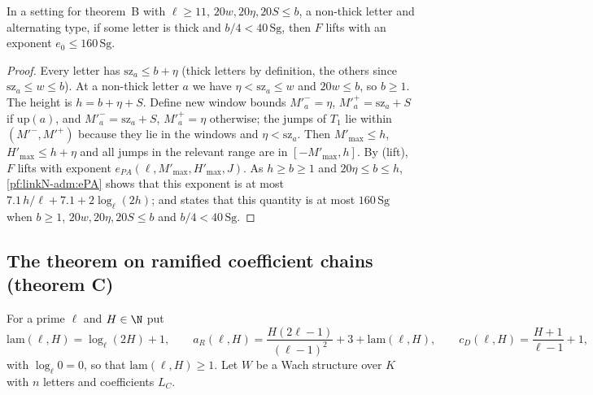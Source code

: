 \begin{lemma}\label{pf:linkN-adm:thick}
In a setting for theorem~B with $\ell\ge11$, $20w,20\eta,20S\le b$, a non-thick letter and alternating type, if some letter is thick
and $b/4<40\,\mathrm{Sg}$, then $F$ lifts with an exponent $e_0\le160\,\mathrm{Sg}$.
\end{lemma}

\begin{proof}
Every letter has $\mathrm{sz}_a\le b+\eta$ (thick letters by definition, the others since $\mathrm{sz}_a\le w\le b$). At a
non-thick letter $a$ we have $\eta<\mathrm{sz}_a\le w$ and $20w\le b$, so $b\ge1$. The height is $h=b+\eta+S$. Define new
window bounds $M'^-_a=\eta$, $M'^+_a=\mathrm{sz}_a+S$ if $\mathrm{up}(a)$, and $M'^-_a=\mathrm{sz}_a+S$, $M'^+_a=\eta$
otherwise; the jumps of $T_1$ lie within $(M'^-,M'^+)$ because they lie in the windows and $\eta<\mathrm{sz}_a$. Then
$M'_{\max}\le h$, $H'_{\max}\le h+\eta$ and all jumps in the relevant range are in $[-M'_{\max},h]$. By (lift), $F$ lifts with
exponent $e_{PA}(\ell,M'_{\max},H'_{\max},J)$. As $h\ge b\ge1$ and $20\eta\le b\le h$, \cref{pf:linkN-adm:ePA} shows that
this exponent is at most $7.1\,h/\ell+7.1+2\log_\ell(2h)$; and  states that this
quantity is at most $160\,\mathrm{Sg}$ when $b\ge1$, $20w,20\eta,20S\le b$ and $b/4<40\,\mathrm{Sg}$.
\end{proof}

\subsection{The theorem on ramified coefficient chains (theorem C)}\label{pf:linkN-adm:thmCsec}

For a prime $\ell$ and $H\in\N$ put
\begin{equation}\label{pf:linkN-adm:eq-aR}
\mathrm{lam}(\ell,H)=\log_\ell(2H)+1,\qquad a_R(\ell,H)=\frac{H(2\ell-1)}{(\ell-1)^2}+3+\mathrm{lam}(\ell,H),\qquad
c_D(\ell,H)=\frac{H+1}{\ell-1}+1,
\end{equation}
with $\log_\ell0=0$, so that $\mathrm{lam}(\ell,H)\ge1$. Let $W$ be a Wach structure over $K$ with $n$ letters and
coefficients $L_C$.

